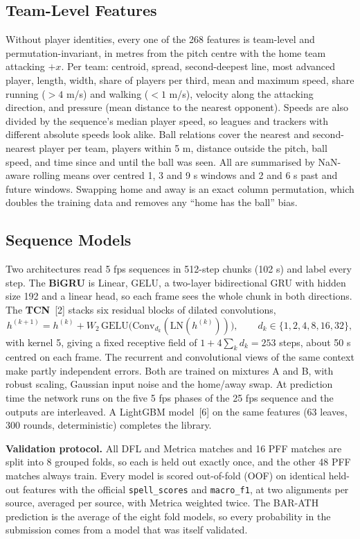 \documentclass[10pt]{article}
\begin{document}
\subsection*{Team-Level Features}
Without player identities, every one of the 268 features is team-level and permutation-invariant, in metres from the pitch centre with the home team attacking $+x$. Per team: centroid, spread, second-deepest line, most advanced player, length, width, share of players per third, mean and maximum speed, share running ($>4$ m/s) and walking ($<1$ m/s), velocity along the attacking direction, and pressure (mean distance to the nearest opponent). Speeds are also divided by the sequence's median player speed, so leagues and trackers with different absolute speeds look alike. Ball relations cover the nearest and second-nearest player per team, players within 5 m, distance outside the pitch, ball speed, and time since and until the ball was seen. All are summarised by NaN-aware rolling means over centred 1, 3 and 9 s windows and 2 and 6 s past and future windows. Swapping home and away is an exact column permutation, which doubles the training data and removes any ``home has the ball'' bias.

\subsection*{Sequence Models}
Two architectures read 5 fps sequences in 512-step chunks (102 s) and label every step. The \textbf{BiGRU} is Linear, GELU, a two-layer bidirectional GRU with hidden size 192 and a linear head, so each frame sees the whole chunk in both directions. The \textbf{TCN}~[2] stacks six residual blocks of dilated convolutions,
\begin{equation}
h^{(k+1)} = h^{(k)} + W_2\, \mathrm{GELU}\big(\mathrm{Conv}_{d_k}(\mathrm{LN}(h^{(k)}))\big), \qquad d_k \in \{1,2,4,8,16,32\},
\end{equation}
with kernel 5, giving a fixed receptive field of $1 + 4\sum_k d_k = 253$ steps, about 50 s centred on each frame. The recurrent and convolutional views of the same context make partly independent errors. Both are trained on mixtures A and B, with robust scaling, Gaussian input noise and the home/away swap. At prediction time the network runs on the five 5 fps phases of the 25 fps sequence and the outputs are interleaved. A LightGBM model~[6] on the same features (63 leaves, 300 rounds, deterministic) completes the library.

\textbf{Validation protocol.} All DFL and Metrica matches and 16 PFF matches are split into 8 grouped folds, so each is held out exactly once, and the other 48 PFF matches always train. Every model is scored out-of-fold (OOF) on identical held-out features with the official \texttt{spell\_scores} and \texttt{macro\_f1}, at two alignments per source, averaged per source, with Metrica weighted twice. The BAR-ATH prediction is the average of the eight fold models, so every probability in the submission comes from a model that was itself validated.
\end{document}
